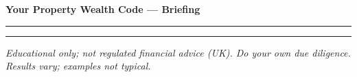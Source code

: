\documentclass[a4paper,11pt]{article}
\begin{document}
{\Huge \textbf{Your Property Wealth Code — Briefing}}\par
{\color{textmuted}\rule{\linewidth}{0.8pt}}



\vspace{4pt}
{\color{textmuted}\rule{\linewidth}{0.5pt}}
{\footnotesize \textit{Educational only; not regulated financial advice (UK). Do your own due diligence. Results vary; examples not typical.}}
\end{document}
